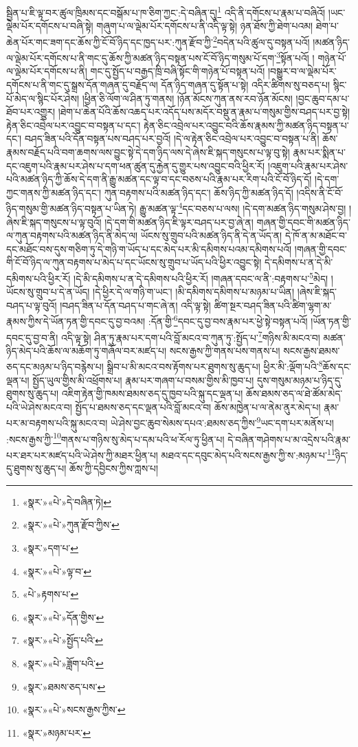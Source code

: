 སྦྱིན་པ་ཇི་ལྟ་བར་ཚུལ་ཁྲིམས་དང་བསྒོམ་པ་ཁ་ཅིག་ཀྱང་:དེ་བཞིན་དུ།\footnote{«སྣར་»«པེ་»དེ་བཞིན་ཏེ།} འདི་ནི་དགོངས་པ་རྣམ་པ་བཞིའོ། །ཡང་ལྡེམ་པོར་དགོངས་པ་བཞི་སྟེ། གཞུག་པ་ལ་ལྡེམ་པོར་དགོངས་པ་ནི་འདི་ལྟ་སྟེ། ཉན་ཐོས་ཀྱི་ཐེག་པའམ། ཐེག་པ་ཆེན་པོར་གང་ཟག་དང་ཆོས་ཀྱི་ངོ་བོ་ཉིད་དང་ཁྱད་པར་:ཀུན་རྫོབ་ཀྱི་\footnote{«སྣར་»«པེ་»ཀུན་རྫོབ་ཀྱིས་}བདེན་པའི་ཚུལ་དུ་བསྟན་པའོ། །མཚན་ཉིད་ལ་ལྡེམ་པོར་དགོངས་པ་ནི་གང་དུ་ཆོས་ཀྱི་མཚན་ཉིད་བསྟན་པས་ངོ་བོ་ཉིད་གསུམ་པོ་དག་\footnote{«སྣར་»དག་པ་}སྟོན་པའོ། །
གཉེན་པོ་ལ་ལྡེམ་པོར་དགོངས་པ་ནི། གང་དུ་སྤྱོད་པ་བརྒྱད་ཁྲི་བཞི་སྟོང་གི་གཉེན་པོ་བསྟན་པའོ། །བསྒྱུར་བ་ལ་ལྡེམ་པོར་དགོངས་པ་ནི་གང་དུ་སྒྲས་དོན་གཞན་དུ་བརྗོད་ལ། དོན་ཉིད་གཞན་དུ་སྟོན་པ་སྟེ། འདིར་ཚིགས་སུ་བཅད་པ། སྙིང་པོ་མེད་ལ་སྙིང་པོར་ཤེས། །ཕྱིན་ཅི་ལོག་ལ་ཤིན་ཏུ་གནས། །ཉོན་མོངས་ཀུན་ནས་རབ་ཉོན་མོངས། །བྱང་ཆུབ་དམ་པ་ཐོབ་པར་འགྱུར། །ཐེག་པ་ཆེན་པོའི་ཆོས་འཆད་པར་འདོད་པས་མདོར་བསྡུ་ན་རྣམ་པ་གསུམ་གྱིས་བཤད་པར་བྱ་སྟེ། རྟེན་ཅིང་འབྲེལ་པར་འབྱུང་བ་བསྟན་པ་དང་། རྟེན་ཅིང་འབྲེལ་པར་འབྱུང་བའི་ཆོས་རྣམས་ཀྱི་མཚན་ཉིད་བསྟན་པ་དང་། བཤད་ཟིན་པའི་དོན་བསྟན་པས་བཤད་པར་བྱའོ། །དེ་ལ་རྟེན་ཅིང་འབྲེལ་པར་འབྱུང་བ་བསྟན་པ་ནི། ཆོས་རྣམས་བརྗོད་པའི་བག་ཆགས་ལས་བྱུང་སྟེ་དེ་དག་ཉིད་ལས་དེ་ཞེས་ཇི་སྐད་གསུངས་པ་ལྟ་བུ་སྟེ། རྣམ་པར་སྨིན་པ་དང་འཇུག་པའི་རྣམ་པར་ཤེས་པ་དག་ཕན་ཚུན་དུ་རྐྱེན་དུ་གྱུར་པས་འབྱུང་བའི་ཕྱིར་རོ། །འཇུག་པའི་རྣམ་པར་ཤེས་པའི་མཚན་ཉིད་ཀྱི་ཆོས་དེ་དག་ནི་རྒྱུ་མཚན་དང་ལྟ་བ་དང་བཅས་པའི་རྣམ་པར་རིག་པའི་ངོ་བོ་ཉིད་དོ། །དེ་དག་ཀྱང་གནས་ཀྱི་མཚན་ཉིད་དང་། ཀུན་བརྟགས་པའི་མཚན་ཉིད་དང་། ཆོས་ཉིད་ཀྱི་མཚན་ཉིད་དོ། །འདིས་ནི་ངོ་བོ་ཉིད་གསུམ་གྱི་མཚན་ཉིད་བསྟན་པ་ཡིན་ཏེ། རྒྱུ་མཚན་ལྟ་\footnote{«སྣར་»«པེ་»ལྟ་བ་}དང་བཅས་པ་ལས། །དེ་དག་མཚན་ཉིད་གསུམ་ཤེས་བྱ། །ཞེས་ཇི་སྐད་གསུངས་པ་ལྟ་བུའོ། །དེ་དག་གི་མཚན་ཉིད་ཇི་ལྟར་བཤད་པར་བྱ་ཞེ་ན། གཞན་གྱི་དབང་གི་མཚན་ཉིད་ལ་ཀུན་བརྟགས་པའི་མཚན་ཉིད་ནི་མེད་ལ། ཡོངས་སུ་གྲུབ་པའི་མཚན་ཉིད་ནི་དེ་ན་ཡོད་ན། དེ་ཁོ་ན་མ་མཐོང་བ་དང་མཐོང་བས་དུས་གཅིག་ཏུ་དེ་གཉི་ག་ཡོད་པ་དང་མེད་པར་མི་དམིགས་པའམ་དམིགས་པའོ། །གཞན་གྱི་དབང་གི་ངོ་བོ་ཉིད་ལ་ཀུན་བརྟགས་པ་མེད་པ་དང་ཡོངས་སུ་གྲུབ་པ་ཡོད་པའི་ཕྱིར་འབྱུང་སྟེ། དེ་དམིགས་པ་ན་དེ་མི་དམིགས་པའི་ཕྱིར་རོ། །དེ་མི་དམིགས་པ་ན་དེ་དམིགས་པའི་ཕྱིར་རོ། །གཞན་དབང་ལ་ནི་:བརྟགས་པ་\footnote{«པེ་»རྟགས་པ་}མེད། །ཡོངས་སུ་གྲུབ་པ་དེ་ན་ཡོད། །དེ་ཕྱིར་དེ་ལ་གཉི་ག་ཡང་། །མི་དམིགས་དམིགས་པ་མཉམ་པ་ཡིན། །ཞེས་ཇི་སྐད་བཤད་པ་ལྟ་བུའོ། །བཤད་ཟིན་པ་དོན་བཤད་པ་གང་ཞེ་ན། འདི་ལྟ་སྟེ། ཚིག་སྔར་བཤད་ཟིན་པའི་ཚིག་ལྷག་མ་རྣམས་ཀྱིས་དེ་ཡོན་ཏན་གྱི་དབང་དུ་བྱ་བའམ། :དོན་གྱི་\footnote{«སྣར་»«པེ་»དོན་གྱིས་}དབང་དུ་བྱ་བས་རྣམ་པར་ཕྱེ་སྟེ་བསྟན་པའོ། །ཡོན་ཏན་གྱི་དབང་དུ་བྱ་བ་ནི། འདི་ལྟ་སྟེ། ཤིན་ཏུ་རྣམ་པར་དག་པའི་བློ་མངའ་བ་ཀུན་ཏུ་:སྤྱོད་པ་\footnote{«སྣར་»«པེ་»སྤྱོད་པའི་}གཉིས་མི་མངའ་བ། མཚན་ཉིད་མེད་པའི་ཆོས་ལ་མཆོག་ཏུ་གཞོལ་བར་མཛད་པ། སངས་རྒྱས་ཀྱི་གནས་པས་གནས་པ། སངས་རྒྱས་ཐམས་ཅད་དང་མཉམ་པ་ཉིད་བརྙེས་པ། སྒྲིབ་པ་མི་མངའ་བས་རྟོགས་པར་ཐུགས་སུ་ཆུད་པ། ཕྱིར་མི་:ལྡོག་པའི་\footnote{«སྣར་»«པེ་»ཟློག་པའི་}ཆོས་དང་ལྡན་པ། སྤྱོད་ཡུལ་གྱིས་མི་འཕྲོགས་པ། རྣམ་པར་གཞག་པ་བསམ་གྱིས་མི་ཁྱབ་པ། དུས་གསུམ་མཉམ་པ་ཉིད་དུ་ཐུགས་སུ་ཆུད་པ། འཇིག་རྟེན་གྱི་ཁམས་ཐམས་ཅད་དུ་ཁྱབ་པའི་སྐུ་དང་ལྡན་པ། ཆོས་ཐམས་ཅད་ལ་ཐེ་ཚོམ་མེད་པའི་ཡེ་ཤེས་མངའ་བ། སྤྱོད་པ་ཐམས་ཅད་དང་ལྡན་པའི་བློ་མངའ་བ། ཆོས་མཁྱེན་པ་ལ་ནེམ་ནུར་མེད་པ། རྣམ་པར་མ་བརྟགས་པའི་སྐུ་མངའ་བ། ཡེ་ཤེས་བྱང་ཆུབ་སེམས་དཔའ་:ཐམས་ཅད་ཀྱིས་\footnote{«སྣར་»ཐམས་ཅད་པས་}ཡང་དག་པར་མནོས་པ། :སངས་རྒྱས་ཀྱི་\footnote{«སྣར་»«པེ་»སངས་རྒྱས་ཀྱིས་}གནས་པ་གཉིས་སུ་མེད་པ་དམ་པའི་ཕ་རོལ་ཏུ་ཕྱིན་པ། དེ་བཞིན་གཤེགས་པ་མ་འདྲེས་པའི་རྣམ་པར་ཐར་པར་མཛད་པའི་ཡེ་ཤེས་ཀྱི་མཐར་ཕྱིན་པ། མཐའ་དང་དབུང་མེད་པའི་སངས་རྒྱས་ཀྱི་ས་:མཉམ་པ་\footnote{«སྣར་»མཉམ་པར་}ཉིད་དུ་ཐུགས་སུ་ཆུད་པ། ཆོས་ཀྱི་དབྱིངས་ཀྱིས་ཀླས་པ། 